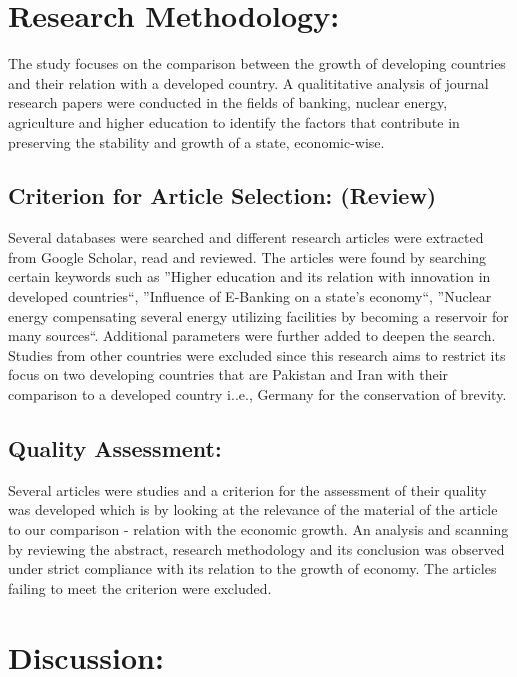 \documentclass[]{article}
\begin{document}
\section{Research Methodology:}

The study focuses on the comparison between the growth of developing countries and their relation with a developed country. A qualititative analysis of journal research papers were conducted in the fields of banking, nuclear energy, agriculture and higher education
to identify the factors that contribute in preserving the stability and growth of a state, economic-wise.

\subsection{Criterion for Article Selection: (Review)}

Several databases were searched and different research articles were extracted from Google Scholar, read and reviewed. The articles were found by searching certain keywords such as ''Higher education and its relation with innovation in developed countries``, ''Influence of E-Banking on a state's economy``, ''Nuclear energy compensating several energy utilizing facilities by becoming a reservoir for many sources``. Additional parameters were further added to deepen the search. Studies from other countries were excluded since this research aims to restrict its focus on two developing countries that are Pakistan and Iran with their comparison to a developed country i..e., Germany for the conservation of brevity.

\subsection{Quality Assessment:}

Several articles were studies and a criterion for the assessment of their quality was developed which is by looking at the relevance of 
the material of the article to our comparison - relation with the economic growth. An analysis and scanning by reviewing the abstract, research methodology and its conclusion was observed under strict compliance with its relation to the growth of economy. The articles failing to meet the criterion were excluded.

\section{Discussion:}
\end{document}
